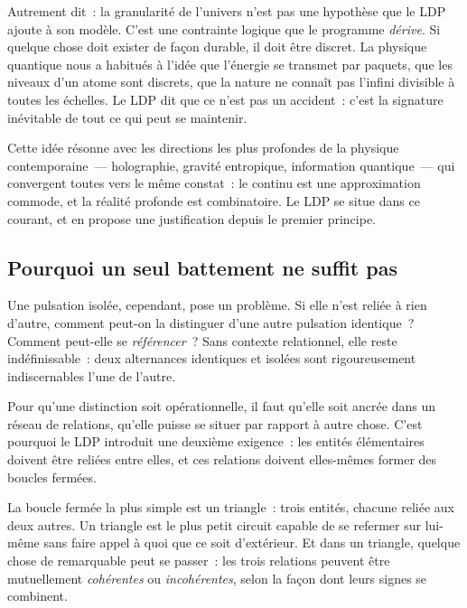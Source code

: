 \documentclass[12pt, a4paper, openright]{book}
\begin{document}
\medskip

Autrement dit~: la granularité de l'univers n'est pas une hypothèse que le LDP ajoute à son modèle. C'est une contrainte logique que le programme \emph{dérive}. Si quelque chose doit exister de façon durable, il doit être discret. La physique quantique nous a habitués à l'idée que l'énergie se transmet par paquets, que les niveaux d'un atome sont discrets, que la nature ne connaît pas l'infini divisible à toutes les échelles. Le LDP dit que ce n'est pas un accident~: c'est la signature inévitable de tout ce qui peut se maintenir.

\medskip

Cette idée résonne avec les directions les plus profondes de la physique contemporaine~--- holographie, gravité entropique, information quantique~--- qui convergent toutes vers le même constat~: le continu est une approximation commode, et la réalité profonde est combinatoire. Le LDP se situe dans ce courant, et en propose une justification depuis le premier principe.

\subsection*{Pourquoi un seul battement ne suffit pas}

Une pulsation isolée, cependant, pose un problème. Si elle n'est reliée à rien d'autre, comment peut-on la distinguer d'une autre pulsation identique~? Comment peut-elle se \emph{référencer}~? Sans contexte relationnel, elle reste indéfinissable~: deux alternances identiques et isolées sont rigoureusement indiscernables l'une de l'autre.

\medskip

Pour qu'une distinction soit opérationnelle, il faut qu'elle soit ancrée dans un réseau de relations, qu'elle puisse se situer par rapport à autre chose. C'est pourquoi le LDP introduit une deuxième exigence~: les entités élémentaires doivent être reliées entre elles, et ces relations doivent elles-mêmes former des boucles fermées.

\medskip

La boucle fermée la plus simple est un triangle~: trois entités, chacune reliée aux deux autres. Un triangle est le plus petit circuit capable de se refermer sur lui-même sans faire appel à quoi que ce soit d'extérieur. Et dans un triangle, quelque chose de remarquable peut se passer~: les trois relations peuvent être mutuellement \emph{cohérentes} ou \emph{incohérentes}, selon la façon dont leurs signes se combinent.
\end{document}
